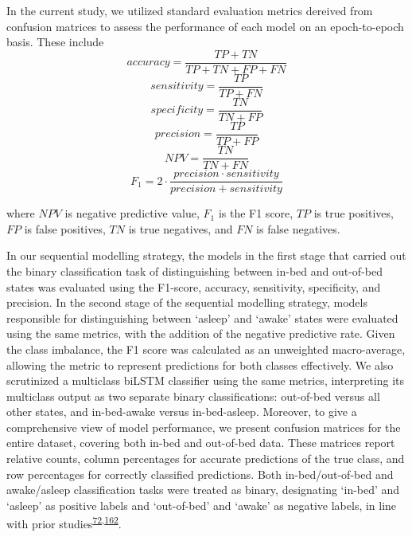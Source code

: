 \documentclass[
  10pt,
]{scrbook}
\begin{document}
In the current study, we utilized standard evaluation metrics dereived
from confusion matrices to assess the performance of each model on an
epoch-to-epoch basis. These include
\[accuracy = \frac{TP+TN}{TP+TN+FP+FN}\]
\[sensitivity = \frac{TP}{TP+FN}\] \[specificity = \frac{TN}{TN+FP}\]
\[precision = \frac{TP}{TP+FP}\] \[NPV = \frac{TN}{TN + FN}\]
\[F_1 = 2 \cdot \frac{precision \cdot sensitivity}{precision + sensitivity}\]

where \(NPV\) is negative predictive value, \(F_1\) is the F1 score,
\(TP\) is true positives, \(FP\) is false positives, \(TN\) is true
negatives, and \(FN\) is false negatives.

In our sequential modelling strategy, the models in the first stage that
carried out the binary classification task of distinguishing between
in-bed and out-of-bed states was evaluated using the F1-score, accuracy,
sensitivity, specificity, and precision. In the second stage of the
sequential modelling strategy, models responsible for distinguishing
between `asleep' and `awake' states were evaluated using the same
metrics, with the addition of the negative predictive rate. Given the
class imbalance, the F1 score was calculated as an unweighted
macro-average, allowing the metric to represent predictions for both
classes effectively. We also scrutinized a multiclass biLSTM classifier
using the same metrics, interpreting its multiclass output as two
separate binary classifications: out-of-bed versus all other states, and
in-bed-awake versus in-bed-asleep. Moreover, to give a comprehensive
view of model performance, we present confusion matrices for the entire
dataset, covering both in-bed and out-of-bed data. These matrices report
relative counts, column percentages for accurate predictions of the true
class, and row percentages for correctly classified predictions. Both
in-bed/out-of-bed and awake/asleep classification tasks were treated as
binary, designating `in-bed' and `asleep' as positive labels and
`out-of-bed' and `awake' as negative labels, in line with prior
studies\textsuperscript{\protect\hyperlink{ref-hjorth_measure_2012}{72},\protect\hyperlink{ref-kushida_comparison_2001}{162}}.
\end{document}
